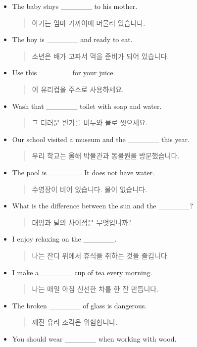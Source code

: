 \documentclass{article}
\begin{document}
\begin{addmargin}[1em]{1em}
\begin{itemize}
    \item The baby stays \_\_\_\_\_\_ to his mother.
    \begin{quote}
    아기는 엄마 가까이에 머물러 있습니다.
    \end{quote}
    \item The boy is \_\_\_\_\_\_ and ready to eat.
    \begin{quote}
    소년은 배가 고파서 먹을 준비가 되어 있습니다.
    \end{quote}
    \item Use this \_\_\_\_\_\_ for your juice.
    \begin{quote}
    이 유리컵을 주스로 사용하세요.
    \end{quote}
    \item Wash that \_\_\_\_\_\_ toilet with soap and water.
    \begin{quote}
    그 더러운 변기를 비누와 물로 씻으세요.
    \end{quote}
    \item Our school visited a museum and the \_\_\_\_\_\_ this year.
    \begin{quote}
    우리 학교는 올해 박물관과 동물원을 방문했습니다.
    \end{quote}
    \item The pool is \_\_\_\_\_\_. It does not have water.
    \begin{quote}
    수영장이 비어 있습니다. 물이 없습니다.
    \end{quote}
    \item What is the difference between the sun and the \_\_\_\_\_\_?
    \begin{quote}
    태양과 달의 차이점은 무엇입니까?
    \end{quote}
    \item I enjoy relaxing on the \_\_\_\_\_\_.
    \begin{quote}
    나는 잔디 위에서 휴식을 취하는 것을 즐깁니다.
    \end{quote}
    \item I make a \_\_\_\_\_\_ cup of tea every morning.
    \begin{quote}
    나는 매일 아침 신선한 차를 한 잔 만듭니다.
    \end{quote}
    \item The broken \_\_\_\_\_\_ of glass is dangerous.
    \begin{quote}
    깨진 유리 조각은 위험합니다.
    \end{quote}
    \item You should wear \_\_\_\_\_\_ when working with wood.

\end{itemize}
\end{addmargin}
\end{document}
